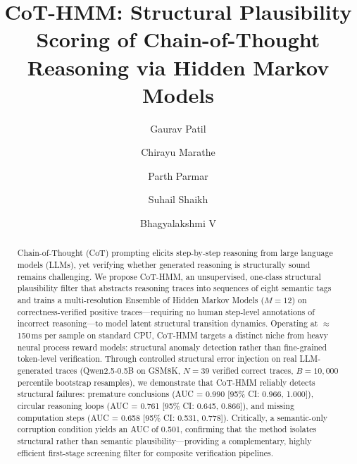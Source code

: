 \documentclass[runningheads]{llncs}
\begin{document}
\title{CoT-HMM: Structural Plausibility Scoring of Chain-of-Thought Reasoning via Hidden Markov Models}

\author{Gaurav Patil \and
Chirayu Marathe \and
Parth Parmar \and
Suhail Shaikh \and
Bhagyalakshmi V}



\maketitle

\begin{abstract}
Chain-of-Thought (CoT) prompting elicits step-by-step reasoning from large language models (LLMs), yet verifying whether generated reasoning is structurally sound remains challenging. We propose CoT-HMM, an unsupervised, one-class structural plausibility filter that abstracts reasoning traces into sequences of eight semantic tags and trains a multi-resolution Ensemble of Hidden Markov Models ($M=12$) on correctness-verified positive traces---requiring no human step-level annotations of incorrect reasoning---to model latent structural transition dynamics. Operating at $\approx$150\,ms per sample on standard CPU, CoT-HMM targets a distinct niche from heavy neural process reward models: structural anomaly detection rather than fine-grained token-level verification. Through controlled structural error injection on real LLM-generated traces (Qwen2.5-0.5B on GSM8K, $N=39$ verified correct traces, $B=10{,}000$ percentile bootstrap resamples), we demonstrate that CoT-HMM reliably detects structural failures: premature conclusions (AUC = 0.990 [95\% CI: 0.966, 1.000]), circular reasoning loops (AUC = 0.761 [95\% CI: 0.645, 0.866]), and missing computation steps (AUC = 0.658 [95\% CI: 0.531, 0.778]). Critically, a semantic-only corruption condition yields an AUC of 0.501, confirming that the method isolates structural rather than semantic plausibility---providing a complementary, highly efficient first-stage screening filter for composite verification pipelines.

\end{abstract}
\end{document}
